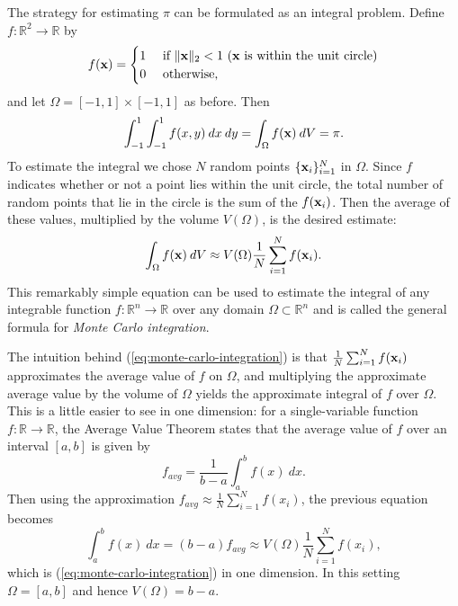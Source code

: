 The strategy for estimating $\pi$ can be formulated as an integral problem.
Define $f:\mathbb{R}^2\rightarrow\mathbb{R}$ by
\[
f(\mathbf{x}) =
\begin{cases}
1 &\mbox{ if $\|\mathbf{x}\|_2 < 1$ ($\mathbf{x}$ is within the unit circle)} \\
0 &\mbox{ otherwise,}
\end{cases}
\]
and let $\Omega = [-1,1] \times [-1,1]$ as before.
Then
\[
\int_{-1}^1\int_{-1}^1 f(x,y)\:dx\:dy = \int_\Omega f(\mathbf{x})\:dV = \pi.
\]
To estimate the integral we chose $N$ random points $\{\mathbf{x}_i\}_{i=1}^N$ in $\Omega$.
Since $f$ indicates whether or not a point lies within the unit circle, the total number of random points that lie in the circle is the sum of the $f(\mathbf{x}_i)$.
Then the average of these values, multiplied by the volume $V(\Omega)$, is the desired estimate:
\begin{equation}
\int_\Omega f(\mathbf{x})\:dV \approx V(\Omega) \frac{1}{N} \sum_{i=1}^N f(\mathbf{x}_i).
\label{eq:monte-carlo-integration}
\end{equation}
This remarkably simple equation can be used to estimate the integral of any integrable function $f:\mathbb{R}^n\rightarrow \mathbb{R}$ over any domain $\Omega \subset \mathbb{R}^n$ and is called the general formula for \emph{Monte Carlo integration}.

The intuition behind (\ref{eq:monte-carlo-integration}) is that $\frac{1}{N} \sum_{i=1}^N f(\mathbf{x}_i)$ approximates the average value of $f$ on $\Omega$, and multiplying the approximate average value by the volume of $\Omega$ yields the approximate integral of $f$ over $\Omega$.
This is a little easier to see in one dimension: for a single-variable function $f:\mathbb{R}\rightarrow\mathbb{R}$, the Average Value Theorem states that the average value of $f$ over an interval $[a,b]$ is given by
\[
f_{avg} = \frac{1}{b-a}\int_a^b f(x)\:dx.
\]
Then using the approximation $f_{avg} \approx \frac{1}{N} \sum_{i=1}^N f(x_i)$, the previous equation becomes
\begin{equation}
\int_a^b f(x)\:dx = (b - a) f_{avg} \approx V(\Omega)\frac{1}{N}\sum_{i=1}^N f(x_i),
\label{eq:monte-carlo-integration-1d}
\end{equation}
which is (\ref{eq:monte-carlo-integration}) in one dimension.
In this setting $\Omega = [a,b]$ and hence $V(\Omega) = b - a$.

